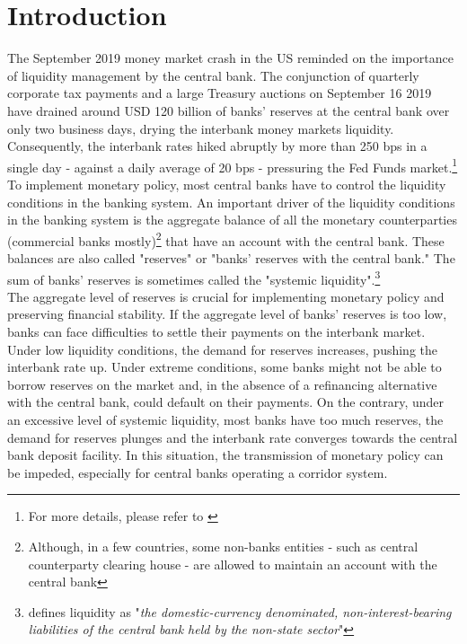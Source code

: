 \section{Introduction}

The September 2019 money  market crash in the US reminded  on the importance of
liquidity  management  by the  central  bank.   The conjunction  of  quarterly
corporate tax payments and a large Treasury auctions on September 16 2019 have
drained around  USD 120 billion  of banks' reserves  at the central  bank over
only    two   business    days,   drying    the   interbank    money   markets
liquidity. Consequently, the  interbank rates hiked abruptly by  more than 250
bps in a single  day - against a daily average of 20  bps - pressuring the Fed
Funds market.\footnote{For more details, please refer to \cite{Anbil2020}}\\

To implement monetary policy, most central banks have to control the liquidity
conditions  in the  banking  system.   An important  driver  of the  liquidity
conditions in the banking system is  the aggregate balance of all the monetary
counterparties   (commercial  banks   mostly)\footnote{Although,   in  a   few
countries, some  non-banks entities  - such  as central  counterparty clearing
house - are allowed to maintain an account with the central bank} that have an
account with the  central bank.  These balances are also  called "reserves" or
"banks'  reserves with  the  central bank."   The sum  of  banks' reserves  is
sometimes  called the  "systemic liquidity".\footnote{\cite{Gray2008}  defines
liquidity  as "\emph{the  domestic-currency denominated,  non-interest-bearing
liabilities of the central bank held by the non-state sector}"}\\

The aggregate  level of reserves  is crucial for implementing  monetary policy
and preserving financial stability.  If the aggregate level of banks' reserves
is  too low,  banks can  face  difficulties to  settle their  payments on  the
interbank  market. Under  low liquidity  conditions, the  demand for  reserves
increases, pushing the interbank rate up. Under extreme conditions, some banks
might not be  able to borrow reserves on  the market and, in the  absence of a
refinancing  alternative  with  the  central  bank,  could  default  on  their
payments.  On  the contrary, under  an excessive level of  systemic liquidity,
most banks  have too much  reserves, the demand  for reserves plunges  and the
interbank rate converges  towards the central bank deposit  facility.  In this
situation, the transmission of monetary  policy can be impeded, especially for
central banks operating a corridor system. \\


